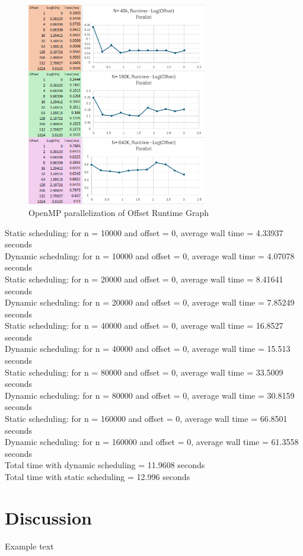 \documentclass[10pt]{report}
\begin{document}
\begin{figure}[h!]
    \centering
    \includegraphics[width=0.7\textwidth]{ompOffsetRuntime.png}
    \caption{OpenMP parallelization of Offset Runtime Graph}
\end{figure}

\newpage
\begin{center}
Static scheduling: for n = 10000 and offset = 0, average wall time = 4.33937 seconds \\
Dynamic scheduling: for n = 10000 and offset = 0, average wall time = 4.07078 seconds \\
Static scheduling: for n = 20000 and offset = 0, average wall time = 8.41641 seconds \\
Dynamic scheduling: for n = 20000 and offset = 0, average wall time = 7.85249 seconds \\
Static scheduling: for n = 40000 and offset = 0, average wall time = 16.8527 seconds \\
Dynamic scheduling: for n = 40000 and offset = 0, average wall time = 15.513 seconds \\
Static scheduling: for n = 80000 and offset = 0, average wall time = 33.5009 seconds \\
Dynamic scheduling: for n = 80000 and offset = 0, average wall time = 30.8159 seconds \\
Static scheduling: for n = 160000 and offset = 0, average wall time = 66.8501 seconds \\
Dynamic scheduling: for n = 160000 and offset = 0, average wall time = 61.3558 seconds \\

Total time with dynamic scheduling = 11.9608 seconds \\
Total time with static scheduling = 12.996 seconds \\
\end{center}

\section{Discussion}
Example text 
\end{document}
